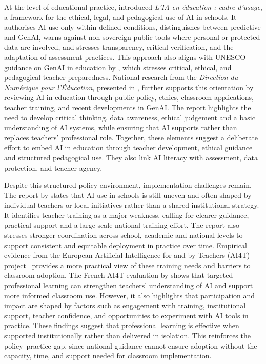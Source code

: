 At the level of educational practice, \cite{menj2025cadreusage} introduced
\textit{L'IA en éducation : cadre d'usage}, a framework for the ethical, legal, and
pedagogical use of AI in schools. It authorises AI use only within defined
conditions, distinguishes between predictive and GenAI, warns against non-sovereign
public tools where personal or protected data are involved, and stresses
transparency, critical verification, and the adaptation of assessment practices. This
approach also aligns with UNESCO guidance on GenAI in education by
\cite{giannini2023generativeai}, which stresses critical, ethical, and pedagogical
teacher preparedness. National research from the \textit{Direction du Numérique pour
l'Éducation}, presented in \cite{dne2024intelligence}, further supports this
orientation by reviewing AI in education through public policy, ethics, classroom
applications, teacher training, and recent developments in GenAI. The report
highlights the need to develop critical thinking, data awareness, ethical judgement
and a basic understanding of AI systems, while ensuring that AI supports rather than
replaces teachers' professional role. Together, these elements suggest a deliberate
effort to embed AI in education through teacher development, ethical guidance and
structured pedagogical use. They also link AI literacy with assessment, data
protection, and teacher agency.

Despite this structured policy environment, implementation challenges remain. The
report by \cite{igesr2025ia} states that AI use in schools is still uneven and often
shaped by individual teachers or local initiatives rather than a shared institutional
strategy. It identifies teacher training as a major weakness, calling for clearer
guidance, practical support and a large-scale national training effort. The report
also stresses stronger coordination across school, academic and national levels to
support consistent and equitable deployment in practice over time. Empirical evidence
from the European Artificial Intelligence for and by Teachers (AI4T)
project~\cite{ai4t2021project} provides a more practical view of these training needs
and barriers to classroom adoption. The French AI4T evaluation by
\cite{paris2023ai4t} shows that targeted professional learning can strengthen
teachers' understanding of AI and support more informed classroom use. However, it
also highlights that participation and impact are shaped by factors such as
engagement with training, institutional support, teacher confidence, and
opportunities to experiment with AI tools in practice. These findings suggest that
professional learning is effective when supported institutionally rather than
delivered in isolation. This reinforces the policy--practice gap, since national
guidance cannot ensure adoption without the capacity, time, and support needed for
classroom implementation.

